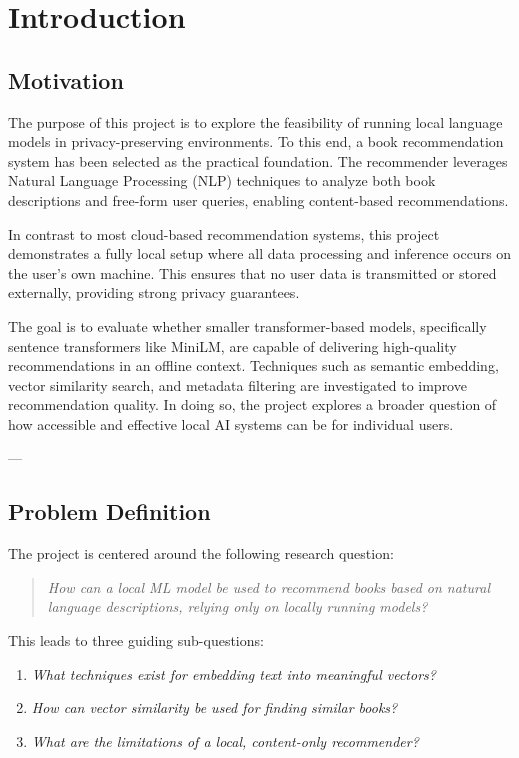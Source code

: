 \chapter{Introduction}
\label{chapter:introduction}

\section{Motivation}
\label{sec:motivation}

The purpose of this project is to explore the feasibility of running local language models in privacy-preserving environments. To this end, a book recommendation system has been selected as the practical foundation. The recommender leverages Natural Language Processing (NLP) techniques to analyze both book descriptions and free-form user queries, enabling content-based recommendations.

In contrast to most cloud-based recommendation systems, this project demonstrates a fully local setup where all data processing and inference occurs on the user's own machine. This ensures that no user data is transmitted or stored externally, providing strong privacy guarantees.

The goal is to evaluate whether smaller transformer-based models, specifically sentence transformers like MiniLM, are capable of delivering high-quality recommendations in an offline context. Techniques such as semantic embedding, vector similarity search, and metadata filtering are investigated to improve recommendation quality. In doing so, the project explores a broader question of how accessible and effective local AI systems can be for individual users.

---

\section{Problem Definition}
\label{sec:problem-definition}

The project is centered around the following research question:

\begin{quote}
\textit{How can a local ML model be used to recommend books based on natural language descriptions, relying only on locally running models?}
\end{quote}
\label{itm:main-question}

This leads to three guiding sub-questions:

\begin{enumerate}
    \item \label{itm:subq-embedding} \textit{What techniques exist for embedding text into meaningful vectors?}
    \item \label{itm:subq-similarity} \textit{How can vector similarity be used for finding similar books?}
    \item \label{itm:subq-limitations} \textit{What are the limitations of a local, content-only recommender?}
\end{enumerate}


